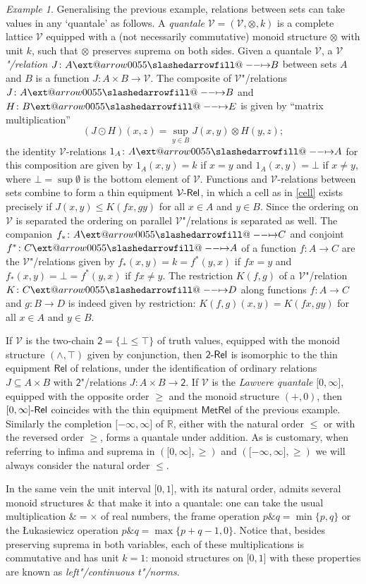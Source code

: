 \documentclass[preprint, a4paper]{elsarticle}
\makeatletter
\def\slashedarrowfill@#1#2#3#4#5{%
  $\m@th\thickmuskip0mu\medmuskip\thickmuskip\thinmuskip\thickmuskip
   \relax#5#1\mkern-7mu%
   \cleaders\hbox{$#5\mkern-2mu#2\mkern-2mu$}\hfill
   \mathclap{#3}\mathclap{#2}%
   \cleaders\hbox{$#5\mkern-2mu#2\mkern-2mu$}\hfill
   \mkern-7mu#4$%
}
\def\rightslashedarrowfill@{%
  \slashedarrowfill@\relbar\relbar\mapstochar\rightarrow}
\newcommand\xslashedrightarrow[2][]{%
  \ext@arrow 0055{\rightslashedarrowfill@}{#1}{#2}}
\def\slashedrightarrow{\xslashedrightarrow{}}
\theoremstyle{definition}
\theoremstyle{remark}
\newtheorem{example}[theorem]{Example}
\providecommand{\tens}{\otimes}
\providecommand{\brcs}[1]{\lbrace #1 \rbrace}
\providecommand{\brks}[1]{\lbrack #1 \rbrack}
\providecommand{\set}[1]{\brcs{#1}}
\newcommand{\tn}{\mathbin\&}
\providecommand{\map}[3]{#1\colon#2\to#3}
\providecommand{\hmap}[3]{#1\colon#2\slashedrightarrow#3}
\providecommand{\catvar}[1]{\mathcal{#1}}
\providecommand{\2}{\mathsf 2}
\providecommand{\V}{\catvar V}
\providecommand{\Rel}{\mathsf{Rel}}
\providecommand{\enRel}[1]{#1\text-\Rel}
\providecommand{\MetRel}{\mathsf{MetRel}}
\providecommand{\hc}{\odot}
\makeatother
\begin{document}
  \begin{example}
  	Generalising the previous example, relations between sets can take values in any `quantale' as follows. A \emph{quantale} $\V = (\V, \tens, k)$ is a complete lattice $\V$ equipped with a (not necessarily commutative) monoid structure $\tens$ with unit $k$, such that $\tens$ preserves suprema on both sides. Given a quantale $\V$, a \emph{$\V$"/relation} $\hmap JAB$ between sets $A$ and $B$ is a function $\map J{A \times B}\V$. The composite of $\V$"/relations $\hmap JAB$ and $\hmap HBE$ is given by ``matrix multiplication''
  	\begin{displaymath}
  		(J \hc H)(x, z) = \sup_{y \in B} J(x, y) \tens H(y, z);
  	\end{displaymath}
  	the identity $\V$-relations $\hmap{1_A}AA$ for this composition are given by $1_A(x, y) = k$ if $x = y$ and $1_A(x, y) = \bot$ if $x \neq y$, where $\bot = \sup \emptyset$ is the bottom element of $\V$. Functions and $\V$-relations between sets combine to form a thin equipment $\enRel\V$, in which a cell as in \eqref{cell} exists precisely if $J(x, y) \leq K(fx, gy)$ for all $x \in A$ and $y \in B$. Since the ordering on $\V$ is separated the ordering on parallel $\V$"/relations is separated as well. The companion $\hmap{f_*}AC$ and conjoint $\hmap{f^*}CA$ of a function $\map fAC$ are the $\V$"/relations given by $f_*(x, y) = k = f^*(y, x)$ if $fx = y$ and $f_*(x, y) = \bot = f^*(y, x)$ if $fx \neq y$. The restriction $K(f, g)$ of a $\V$"/relation $\hmap KCD$ along functions $\map fAC$ and $\map gBD$ is indeed given by restriction: $K(f, g)(x, y) = K(fx, gy)$ for all $x \in A$ and $y \in B$.
  	
  	If $\V$ is the two-chain $\2 = \brcs{\bot \leq \top}$ of truth values, equipped with the monoid structure $(\wedge, \top)$ given by conjunction, then $\enRel\2$ is isomorphic to the thin equipment $\Rel$ of relations, under the identification of ordinary relations $J \subseteq A \times B$ with $\2$"/relations $\map J{A \times B}\2$. If $\V$ is the \emph{Lawvere quantale} $\brks{0, \infty}$, equipped with the opposite order  $\geq$ and the monoid structure $(+, 0)$, then $\enRel{\brks{0, \infty}}$ coincides with the thin equipment $\MetRel$ of the previous example. Similarly the completion $\brks{-\infty, \infty}$ of $\mathbb R$, either with the natural order $\leq$ or with the reversed order $\geq$, forms a quantale under addition. As is customary, when referring to infima and suprema in $(\brks{0, \infty}, \geq)$ and $(\brks{-\infty, \infty}, \geq)$ we will always consider the natural order $\leq$.
  	
  	In the same vein the unit interval $\brks{0, 1}$, with its natural order, admits several monoid structures $\tn$ that make it into a quantale: one can take the usual multiplication $\tn = \times$ of real numbers, the frame operation $p \tn q = \min\set{p, q}$ or the \L ukasiewicz operation $p \tn q = \max\set{p+q-1,0}$. Notice that, besides preserving suprema in both variables, each of these multiplications is commutative and has unit $k = 1$: monoid structures on $\brks{0, 1}$ with these properties are known as \emph{left"/continuous t"/norms}.
  \end{example}
  
\end{document}
